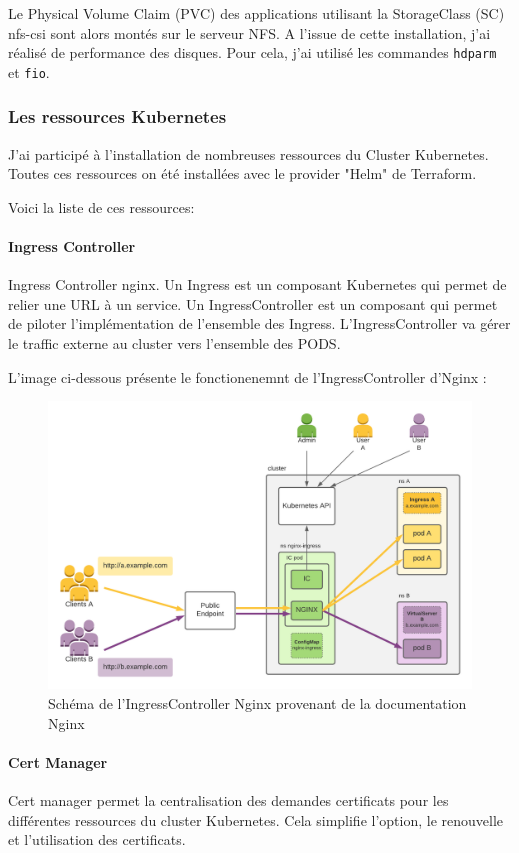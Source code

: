\documentclass[12pt]{article}
\begin{document}
Le Physical Volume Claim (PVC) des applications utilisant la StorageClass (SC) nfs-csi sont alors montés sur le serveur NFS.
A l'issue de cette installation, j'ai réalisé de performance des disques.
Pour cela, j'ai utilisé les commandes \verb|hdparm| et \verb|fio|.

\subsubsection{Les ressources Kubernetes}
J'ai participé à l'installation de nombreuses ressources du Cluster Kubernetes.
Toutes ces ressources on été installées avec le provider "Helm" de Terraform.

Voici la liste de ces ressources:
\paragraph{Ingress Controller}
Ingress Controller nginx. Un Ingress est un composant Kubernetes qui permet de relier une URL à un service.
Un IngressController est un composant qui permet de piloter l'implémentation de l'ensemble des Ingress.
L'IngressController va gérer le traffic externe au cluster vers l'ensemble des PODS.

L'image ci-dessous présente le fonctionenemnt de l'IngressController d'Nginx :

\begin{figure}[!ht]
    \centering
        \includegraphics[width=\textwidth]{src/ic_nginx.png}
    \caption{Schéma de l'IngressController Nginx provenant de la documentation Nginx}
    \label{fig:ic_nginx}
\end{figure}

\paragraph{Cert Manager}
Cert manager permet la centralisation des demandes certificats pour les différentes ressources du cluster Kubernetes.
Cela simplifie l'option, le renouvelle et l'utilisation des certificats.
\end{document}
